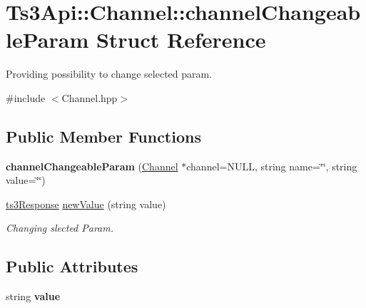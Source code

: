\hypertarget{struct_ts3_api_1_1_channel_1_1channel_changeable_param}{}\section{Ts3\+Api\+:\+:Channel\+:\+:channel\+Changeable\+Param Struct Reference}
\label{struct_ts3_api_1_1_channel_1_1channel_changeable_param}


Providing possibility to change selected param.  




{\ttfamily \#include $<$Channel.\+hpp$>$}

\subsection*{Public Member Functions}
\begin{DoxyCompactItemize}
\item 
{\bfseries channel\+Changeable\+Param} (\hyperlink{class_ts3_api_1_1_channel}{Channel} $\ast$channel=N\+U\+LL, string name=\char`\"{}\char`\"{}, string value=\char`\"{}\char`\"{})\hypertarget{struct_ts3_api_1_1_channel_1_1channel_changeable_param_a6e66d82370f40616a93bce67703a4844}{}\label{struct_ts3_api_1_1_channel_1_1channel_changeable_param_a6e66d82370f40616a93bce67703a4844}

\item 
\hyperlink{struct_ts3_api_1_1ts3_response}{ts3\+Response} \hyperlink{struct_ts3_api_1_1_channel_1_1channel_changeable_param_a9c6973de92919890c973b5ac4d32e20d}{new\+Value} (string value)
\begin{DoxyCompactList}\small\item\em Changing slected Param. \end{DoxyCompactList}\end{DoxyCompactItemize}
\subsection*{Public Attributes}
\begin{DoxyCompactItemize}
\item 
string {\bfseries value}\hypertarget{struct_ts3_api_1_1_channel_1_1channel_changeable_param_a495619b6ac76d4723792cc5f1dd39c8c}{}\label{struct_ts3_api_1_1_channel_1_1channel_changeable_param_a495619b6ac76d4723792cc5f1dd39c8c}

\end{DoxyCompactItemize}
